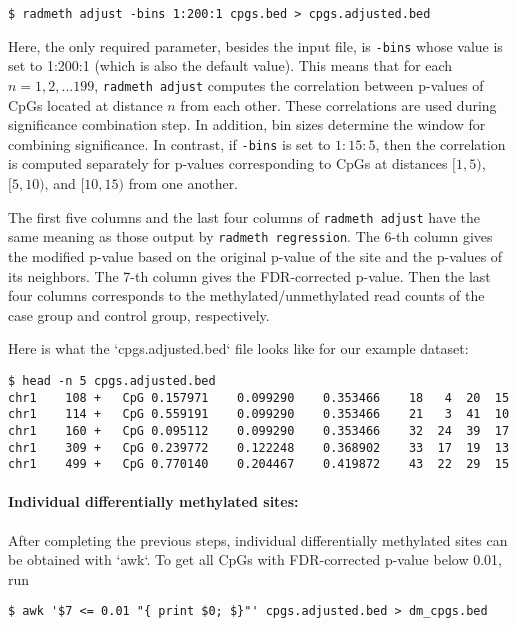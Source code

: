 \documentclass[10pt]{article}
\begin{document}
{\small{%
\begin{verbatim}
$ radmeth adjust -bins 1:200:1 cpgs.bed > cpgs.adjusted.bed
\end{verbatim}%
}}

Here, the only required parameter, besides the input file, is {\tt -bins}
whose value is set to 1:200:1 (which is also the default value). This means
that for  each $n = 1, 2, . . . 199$, {\tt radmeth adjust} computes the
correlation between p-values of CpGs located at distance $n$ from each other.
These correlations are used during significance combination step. In
addition, bin sizes determine the window for combining significance. In
contrast, if {\tt -bins} is set to $1:15:5$, then the correlation is computed
separately for p-values corresponding to CpGs at distances $[1, 5)$, $[5,
10)$, and $[10, 15)$ from one another.

The first five columns and the last four columns of {\tt radmeth adjust} have
the same meaning as those output by {\tt radmeth regression}. The 6-th column
gives the modified p-value based on the original p-value of the site and the
p-values of its neighbors. The 7-th column gives the FDR-corrected p-value.
Then the last four columns corresponds to the methylated/unmethylated read
counts of the case group and control group, respectively.

Here is what the `cpgs.adjusted.bed` ﬁle looks like for our example dataset:

{\small{%
\begin{verbatim}
$ head -n 5 cpgs.adjusted.bed
chr1	108	+	CpG	0.157971	0.099290	0.353466	18	 4	20	15
chr1	114	+	CpG	0.559191	0.099290	0.353466	21	 3	41	10
chr1	160	+	CpG	0.095112	0.099290	0.353466	32	24	39	17
chr1	309	+	CpG	0.239772	0.122248	0.368902	33	17	19	13
chr1	499	+	CpG	0.770140	0.204467	0.419872	43	22	29	15
\end{verbatim}%
}}

\paragraph{Individual differentially methylated sites:} After completing the 
previous steps, individual differentially methylated sites can be obtained with 
`awk`. To get all CpGs with FDR-corrected p-value below 0.01, run

{\small{%
\begin{verbatim}
$ awk '$7 <= 0.01 "{ print $0; $}"' cpgs.adjusted.bed > dm_cpgs.bed
\end{verbatim}%
}}
\end{document}

